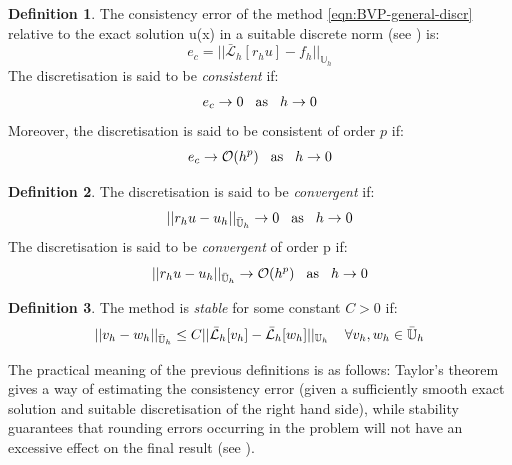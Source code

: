 \documentclass[11pt]{article}
\theoremstyle{theorem}
\theoremstyle{definition}
\newtheorem{definition}{Definition}
\begin{document}
\begin{definition}
	\label{defn:consistency}
	The consistency error of the method \eqref{eqn:BVP-general-discr} relative to the exact solution u(x) in a suitable discrete norm (see \cite{lec-notes}) is:
	$$e_c=||\bar{\mathcal{L}}_h[r_hu]-f_h||_{\mathbb{U}_h} $$
	The discretisation is said to be \emph{consistent} if: 
	\begin{equation}
		\label{eqn:consistent}
		e_c\rightarrow 0\hspace{3mm}\text{as}\hspace{3mm}h\rightarrow 0
	\end{equation}
	Moreover, the discretisation is said to be consistent of order $p$ if:
	\begin{equation}
	\label{eqn:consistent-p}
	e_c\rightarrow\mathcal{O}(h^p)\hspace{3mm}\text{as}\hspace{3mm}h\rightarrow 0
	\end{equation}
\end{definition}

\begin{definition}
	The discretisation is said to be \emph{convergent} if: 
	\begin{equation}
	\label{eqn:convergent}
	||r_h u-u_h||_{{\bar{\mathbb{U}}}_h}\rightarrow 0\hspace{3mm}\text{as}\hspace{3mm}h\rightarrow 0
	\end{equation}
	The discretisation is said to be \emph{convergent} of order p if: 
	\begin{equation}
	\label{eqn:convergent-p}
	||r_h u-u_h||_{{\bar{\mathbb{U}}}_h}\rightarrow \mathcal{O}(h^p)\hspace{3mm}\text{as}\hspace{3mm}h\rightarrow 0
	\end{equation}
\end{definition}

\begin{definition}
	The method is \emph{stable} for some constant $C>0$ if:
	\begin{equation}
	\label{eqn:stable}
	||v_h - w_h||_{{\bar{\mathbb{U}}}_h}\le C||\bar{\mathcal{L}}_h[v_h]-\bar{\mathcal{L}}_h[w_h]||_{{{\mathbb{U}}}_h}\hspace{4mm} \forall v_h,w_h\in\bar{\mathbb{U}}_h
	\end{equation}
\end{definition}

The practical meaning of the previous definitions is as follows: Taylor’s theorem gives a way of estimating the consistency error (given a sufficiently smooth exact solution and suitable discretisation of the right hand side), while stability guarantees that rounding errors occurring in the problem will not have an excessive effect on the final result (see \cite{lec-notes}).
\end{document}
